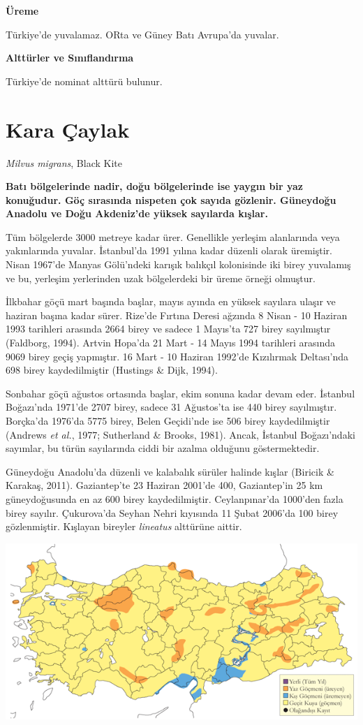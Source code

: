 \documentclass[
  a4paper,
  DIV=11,
  numbers=noendperiod]{scrreprt}
\begin{document}
\textbf{Üreme}

Türkiye'de yuvalamaz. ORta ve Güney Batı Avrupa'da yuvalar.

\textbf{Alttürler ve Sınıflandırma}

Türkiye'de nominat alttürü bulunur.

\section{Kara Çaylak}\label{kara-uxe7aylak}

\emph{Milvus migrans}, Black Kite

\textbf{Batı bölgelerinde nadir, doğu bölgelerinde ise yaygın bir yaz
konuğudur. Göç sırasında nispeten çok sayıda gözlenir. Güneydoğu Anadolu
ve Doğu Akdeniz'de yüksek sayılarda kışlar.}

Tüm bölgelerde 3000 metreye kadar ürer. Genellikle yerleşim alanlarında
veya yakınlarında yuvalar. İstanbul'da 1991 yılına kadar düzenli olarak
üremiştir. Nisan 1967'de Manyas Gölü'ndeki karışık balıkçıl kolonisinde
iki birey yuvalamış ve bu, yerleşim yerlerinden uzak bölgelerdeki bir
üreme örneği olmuştur.

İlkbahar göçü mart başında başlar, mayıs ayında en yüksek sayılara
ulaşır ve haziran başına kadar sürer. Rize'de Fırtına Deresi ağzında 8
Nisan - 10 Haziran 1993 tarihleri arasında 2664 birey ve sadece 1
Mayıs'ta 727 birey sayılmıştır (Faldborg, 1994). Artvin Hopa'da 21 Mart
- 14 Mayıs 1994 tarihleri arasında 9069 birey geçiş yapmıştır. 16 Mart -
10 Haziran 1992'de Kızılırmak Deltası'nda 698 birey kaydedilmiştir
(Hustings \& Dijk, 1994).

Sonbahar göçü ağustos ortasında başlar, ekim sonuna kadar devam eder.
İstanbul Boğazı'nda 1971'de 2707 birey, sadece 31 Ağustos'ta ise 440
birey sayılmıştır. Borçka'da 1976'da 5775 birey, Belen Geçidi'nde ise
506 birey kaydedilmiştir (Andrews \emph{et al.}, 1977; Sutherland \&
Brooks, 1981). Ancak, İstanbul Boğazı'ndaki sayımlar, bu türün
sayılarında ciddi bir azalma olduğunu göstermektedir.

Güneydoğu Anadolu'da düzenli ve kalabalık sürüler halinde kışlar
(Biricik \& Karakaş, 2011). Gaziantep'te 23 Haziran 2001'de 400,
Gaziantep'in 25 km güneydoğusunda en az 600 birey kaydedilmiştir.
Ceylanpınar'da 1000'den fazla birey sayılır. Çukurova'da Seyhan Nehri
kıyısında 11 Şubat 2006'da 100 birey gözlenmiştir. Kışlayan bireyler
\emph{lineatus} alttürüne aittir.

\includegraphics{images/harita_Page_107.png}
\end{document}
